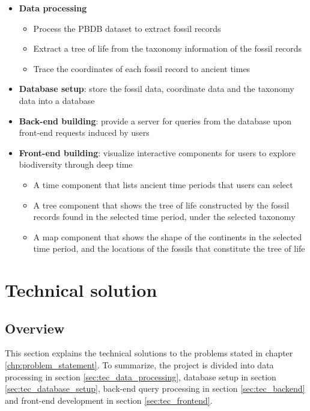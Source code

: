 \documentclass[11pt, a4paper,oneside,chapterprefix=false]{scrbook}
\begin{document}
\begin{itemize}
	\item \textbf{Data processing}
	\begin{itemize}
		\item Process the PBDB dataset to extract fossil records 
		\item Extract a tree of life from the taxonomy information of the fossil records
		\item Trace the coordinates of each fossil record to ancient times
	\end{itemize} 
	\item \textbf{Database setup}: store the fossil data, coordinate data and the taxonomy data into a database
	\item \textbf{Back-end building}: provide a server for queries from the database upon front-end requests induced by users 
	\item \textbf{Front-end building}: visualize interactive components for users to explore biodiversity through deep time
	\begin{itemize}
		\item A time component that lists ancient time periods that users can select
		\item A tree component that shows the tree of life constructed by the fossil records found in the selected time period, under the selected taxonomy
		\item A map component that shows the shape of the continents in the selected time period, and the locations of the fossils that constitute the tree of life   
	\end{itemize} 
\end{itemize} 

\chapter{Technical solution} \label{chp:technical_solution}
\section{Overview}\label{sec:tec_overview}
This section explains the technical solutions to the problems stated in chapter \ref{chp:problem_statement}. To summarize, the project is divided into data processing in section \ref{sec:tec_data_processing}, database setup in section \ref{sec:tec_database_setup}, back-end query processing in section \ref{sec:tec_backend} and front-end development in section \ref{sec:tec_frontend}.
\end{document}
